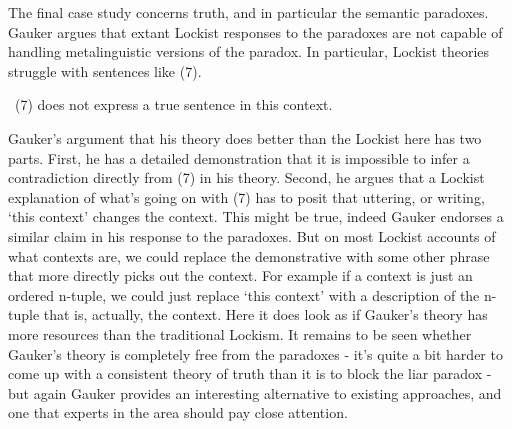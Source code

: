 \documentclass[
  11pt,
  letterpaper,
  DIV=11,
  numbers=noendperiod,
  twoside]{scrartcl}
\providecommand{\tightlist}{%
  \setlength{\itemsep}{0pt}\setlength{\parskip}{0pt}}
\begin{document}
The final case study concerns truth, and in particular the semantic
paradoxes. Gauker argues that extant Lockist responses to the paradoxes
are not capable of handling metalinguistic versions of the paradox. In
particular, Lockist theories struggle with sentences like (7).

\begin{description}
\tightlist
\item[(7)]
~(7) does not express a true sentence in this context.
\end{description}

Gauker's argument that his theory does better than the Lockist here has
two parts. First, he has a detailed demonstration that it is impossible
to infer a contradiction directly from (7) in his theory. Second, he
argues that a Lockist explanation of what's going on with (7) has to
posit that uttering, or writing, `this context' changes the context.
This might be true, indeed Gauker endorses a similar claim in his
response to the paradoxes. But on most Lockist accounts of what contexts
are, we could replace the demonstrative with some other phrase that more
directly picks out the context. For example if a context is just an
ordered n-tuple, we could just replace `this context' with a description
of the n-tuple that is, actually, the context. Here it does look as if
Gauker's theory has more resources than the traditional Lockism. It
remains to be seen whether Gauker's theory is completely free from the
paradoxes - it's quite a bit harder to come up with a consistent theory
of truth than it is to block the liar paradox - but again Gauker
provides an interesting alternative to existing approaches, and one that
experts in the area should pay close attention.
\end{document}
